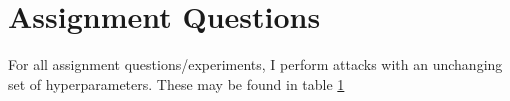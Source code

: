 \documentclass{article}
\begin{document}
\section{Assignment Questions}
        

For all assignment questions/experiments, I perform attacks with an unchanging set of hyperparameters.
These may be found in table \ref{tab:attack_hyperparameters}

\begin{table}
    \centering
    \begin{tabular}{c}
        
    \end{tabular}
    \caption{}
    \label{tab:attack_hyperparameters}
\end{table}
\end{document}
